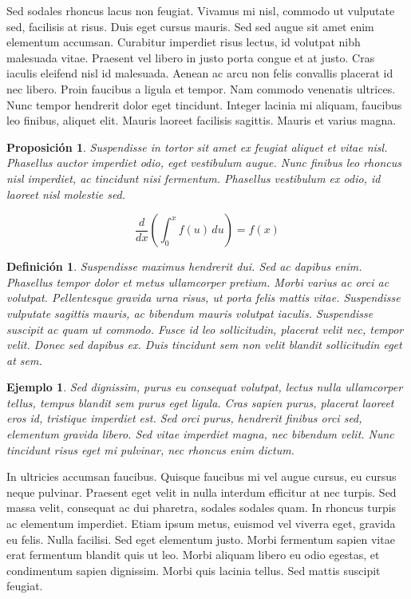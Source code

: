 \documentclass[10pt, a4paper]{article}
\makeatletter
\renewenvironment{proof}[1][\proofname] {\par\pushQED{\qed}\normalfont\topsep6\p@\@plus6\p@\relax\trivlist\item[\hskip\labelsep\itshape\sffamily#1\@addpunct{.}]\ignorespaces}{\popQED\endtrivlist\@endpefalse}
\theoremstyle{theorem-style}
\newtheorem{nprop}{Proposición}[section]
\theoremstyle{definition-style}
\newtheorem{ndef}{Definición}[section]
\theoremstyle{remark-style}
\theoremstyle{example-style}
\newtheorem{ejemplo}{Ejemplo}[section]
\theoremstyle{definition-style}
\theoremstyle{remark-style}
\makeatother
\begin{document}
\begin{proof}
  Sed sodales rhoncus lacus non feugiat. Vivamus mi nisl, commodo ut vulputate sed, facilisis at risus. Duis eget cursus mauris. Sed sed augue sit amet enim elementum accumsan. Curabitur imperdiet risus lectus, id volutpat nibh malesuada vitae. Praesent vel libero in justo porta congue et at justo. Cras iaculis eleifend nisl id malesuada. Aenean ac arcu non felis convallis placerat id nec libero. Proin faucibus a ligula et tempor. Nam commodo venenatis ultrices. Nunc tempor hendrerit dolor eget tincidunt. Integer lacinia mi aliquam, faucibus leo finibus, aliquet elit. Mauris laoreet facilisis sagittis. Mauris et varius magna.
\end{proof}

\begin{nprop}
  Suspendisse in tortor sit amet ex feugiat aliquet et vitae nisl. Phasellus auctor imperdiet odio, eget vestibulum augue. Nunc finibus leo rhoncus nisl imperdiet, ac tincidunt nisi fermentum. Phasellus vestibulum ex odio, id laoreet nisl molestie sed.

  $$\frac{d}{dx}\left( \int_{0}^{x} f(u)\,du\right)=f(x)$$
\end{nprop}

\begin{ndef}
  Suspendisse maximus hendrerit dui. Sed ac dapibus enim. Phasellus tempor dolor et metus ullamcorper pretium. Morbi varius ac orci ac volutpat. Pellentesque gravida urna risus, ut porta felis mattis vitae. Suspendisse vulputate sagittis mauris, ac bibendum mauris volutpat iaculis. Suspendisse suscipit ac quam ut commodo. Fusce id leo sollicitudin, placerat velit nec, tempor velit. Donec sed dapibus ex. Duis tincidunt sem non velit blandit sollicitudin eget at sem.
\end{ndef}

\begin{ejemplo}
  Sed dignissim, purus eu consequat volutpat, lectus nulla ullamcorper tellus, tempus blandit sem purus eget ligula. Cras sapien purus, placerat laoreet eros id, tristique imperdiet est. Sed orci purus, hendrerit finibus orci sed, elementum gravida libero. Sed vitae imperdiet magna, nec bibendum velit. Nunc tincidunt risus eget mi pulvinar, nec rhoncus enim dictum.
\end{ejemplo}

In ultricies accumsan faucibus. Quisque faucibus mi vel augue cursus, eu cursus neque pulvinar. Praesent eget velit in nulla interdum efficitur at nec turpis. Sed massa velit\footnotemark, consequat ac dui pharetra, sodales sodales quam. In rhoncus turpis ac elementum imperdiet. Etiam ipsum metus, euismod vel viverra eget, gravida eu felis. Nulla facilisi. Sed eget elementum justo. Morbi fermentum sapien vitae erat fermentum blandit quis ut leo. Morbi aliquam libero eu odio egestas, et condimentum sapien dignissim. Morbi quis lacinia tellus. Sed mattis suscipit feugiat.
\end{document}
